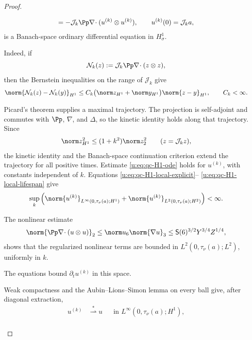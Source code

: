 \begin{proof}
\begin{samepage}
\begin{equation}
 =-\mathcal J_k\Pp\nabla\!\cdot
   (u^{(k)}\otimes u^{(k)}),
 \qquad u^{(k)}(0)=\mathcal J_ka,
 \label{u:eq:qc-H1-Friedrichs-system}
\end{equation}
is a Banach-space ordinary differential equation in \(H^1_\sigma\).
\end{samepage}
\begin{samepage}
Indeed, if
\[
 \mathcal N_k(z):=\mathcal J_k\Pp\nabla\!\cdot(z\otimes z),
\]
then the Bernstein inequalities on the range of \(\mathcal J_k\) give
\begin{equation}
 \norm{\mathcal N_k(z)-\mathcal N_k(y)}_{H^1}
 \le C_k\bigl(\norm z_{H^1}+\norm y_{H^1}\bigr)
       \norm{z-y}_{H^1},
 \qquad C_k<\infty.
 \label{u:eq:qc-H1-Friedrichs-Lipschitz}
\end{equation}
\end{samepage}
Picard's theorem supplies a maximal trajectory.  The projection is
self-adjoint and commutes with \(\Pp\), \(\nabla\), and \(\Delta\), so the
kinetic identity holds along that trajectory.  Since
\begin{equation}
 \norm z_{H^1}^2\le(1+k^2)\norm z_2^2
 \qquad(z=\mathcal J_kz),
 \label{u:eq:qc-H1-Friedrichs-band-control}
\end{equation}
the kinetic identity and the Banach-space continuation criterion extend the
trajectory for all positive times.  Estimate
\eqref{u:eq:qc-H1-ode} holds for \(u^{(k)}\), with constants independent of
\(k\).  Equations \eqref{u:eq:qc-H1-local-explicit}--%
\eqref{u:eq:qc-H1-local-lifespan} give
\begin{equation}
 \sup_k\left(
 \norm{u^{(k)}}_{L^\infty(0,\tau_\nu(a);H^1)}
 +\norm{u^{(k)}}_{L^2(0,\tau_\nu(a);H^2)}
 \right)<\infty.
 \label{u:eq:qc-H1-Friedrichs-uniform}
\end{equation}
\begin{samepage}
The nonlinear estimate
\[
 \norm{\Pp\nabla\!\cdot(u\otimes u)}_2
 \le \norm u_6\norm{\nabla u}_3
 \le \mathsf S(6)^{3/2}Y^{3/4}Z^{1/4},
\]
shows that the regularized nonlinear terms are bounded in
\(L^2(0,\tau_\nu(a);L^2)\), uniformly in \(k\).
\par
\end{samepage}
The equations bound
\(\partial_tu^{(k)}\) in this space.
\begin{samepage}
Weak compactness and the
Aubin--Lions--Simon lemma \cite{Aubin1963,Simon1987} on every ball give, after diagonal
extraction,
\begin{align*}
 u^{(k)}&\stackrel{*}{\rightharpoonup} u
 &&\text{in }L^\infty(0,\tau_\nu(a);H^1),\\

\end{align*}
\end{samepage}
\end{proof}
